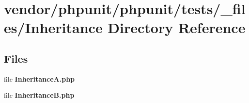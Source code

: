\section{vendor/phpunit/phpunit/tests/\+\_\+files/\+Inheritance Directory Reference}
\label{dir_51302090a1e4230a7e3945663495e844}
\subsection*{Files}
\begin{DoxyCompactItemize}
\item 
file {\bf Inheritance\+A.\+php}
\item 
file {\bf Inheritance\+B.\+php}
\end{DoxyCompactItemize}
